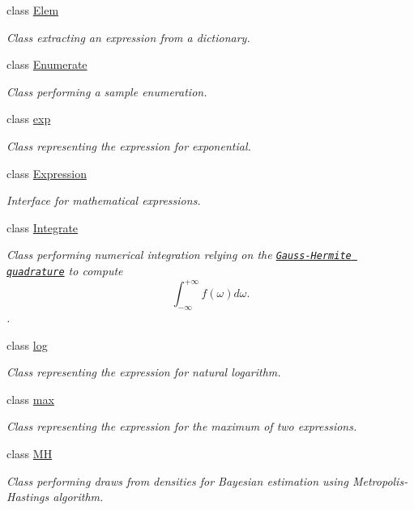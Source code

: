 \begin{DoxyCompactItemize}
class \hyperlink{classbio__expression_1_1_elem}{Elem}
\begin{DoxyCompactList}\small\item\em Class extracting an expression from a dictionary. \end{DoxyCompactList}\item 
class \hyperlink{classbio__expression_1_1_enumerate}{Enumerate}
\begin{DoxyCompactList}\small\item\em Class performing a sample enumeration. \end{DoxyCompactList}\item 
class \hyperlink{classbio__expression_1_1exp}{exp}
\begin{DoxyCompactList}\small\item\em Class representing the expression for exponential. \end{DoxyCompactList}\item 
class \hyperlink{classbio__expression_1_1_expression}{Expression}
\begin{DoxyCompactList}\small\item\em Interface for mathematical expressions. \end{DoxyCompactList}\item 
class \hyperlink{classbio__expression_1_1_integrate}{Integrate}
\begin{DoxyCompactList}\small\item\em Class performing numerical integration relying on the \href{http://en.wikipedia.org/wiki/Gaussian_quadrature}{\tt Gauss-\/\+Hermite quadrature} to compute \[ \int_{-\infty}^{+\infty} f(\omega) d\omega. \]. \end{DoxyCompactList}\item 
class \hyperlink{classbio__expression_1_1log}{log}
\begin{DoxyCompactList}\small\item\em Class representing the expression for natural logarithm. \end{DoxyCompactList}\item 
class \hyperlink{classbio__expression_1_1max}{max}
\begin{DoxyCompactList}\small\item\em Class representing the expression for the maximum of two expressions. \end{DoxyCompactList}\item 
class \hyperlink{classbio__expression_1_1_m_h}{M\+H}
\begin{DoxyCompactList}\small\item\em Class performing draws from densities for Bayesian estimation using Metropolis-\/\+Hastings algorithm. \end{DoxyCompactList}\item 

\end{DoxyCompactItemize}
